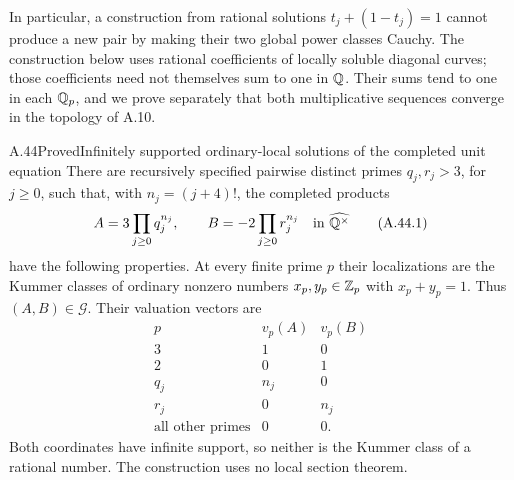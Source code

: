 In particular, a construction from rational solutions
$t_j+(1-t_j)=1$ cannot produce a new pair by making their
two global power classes Cauchy. The construction below
uses rational coefficients of locally soluble diagonal
curves; those coefficients need not themselves sum to one
in $\mathbb Q$. Their sums tend to one in each $\mathbb Q_p$, and we
prove separately that both multiplicative sequences
converge in the topology of A.10.



\begin{statement}{A.44}{Proved}{Infinitely supported ordinary-local solutions of the completed unit equation}
There are recursively specified pairwise distinct primes
$q_j,r_j>3$, for $j\ge0$, such that, with $n_j=(j+4)!$,
the completed products
\[
 A=3\prod_{j\ge0}q_j^{n_j},
 \qquad B=-2\prod_{j\ge0}r_j^{n_j}
       \quad\text{in }\widehat{\mathbb Q^\times}
 \tag{A.44.1}
\]
have the following properties. At every finite prime $p$
their localizations are the Kummer classes of ordinary
nonzero numbers $x_p,y_p\in\mathbb Z_p$ with $x_p+y_p=1$.
Thus $(A,B)\in\mathcal G$. Their valuation vectors are
\[
 \begin{array}{c|cc}
 p&v_p(A)&v_p(B)\\\hline
 3&1&0\\
 2&0&1\\
 q_j&n_j&0\\
 r_j&0&n_j\\
 \text{all other primes}&0&0.
 \end{array}
 \tag{A.44.2}
\]
Both coordinates have infinite support, so neither is the
Kummer class of a rational number. The construction uses
no local section theorem.
\end{statement}
